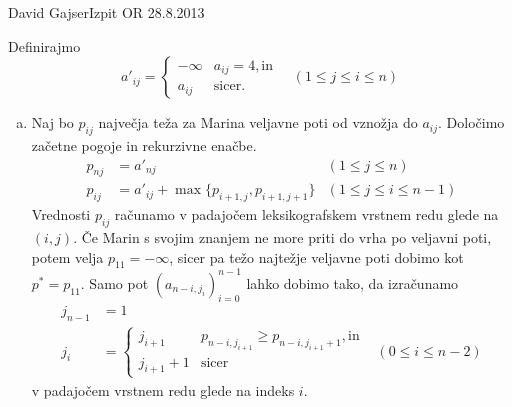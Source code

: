 \begin{naloga}{David Gajser}{Izpit OR 28.8.2013}
\begin{odgovor}
Definirajmo
$$
a'_{ij} = \begin{cases}
-\infty & a_{ij} = 4, \text{in} \\
a_{ij} & \text{sicer} .
\end{cases} \quad (1 \le j \le i \le n)
$$
\begin{enumerate}[(a)]
\item Naj bo $p_{ij}$ največja teža za Marina veljavne poti
od vznožja do $a_{ij}$.
Določimo začetne pogoje in rekurzivne enačbe.
\begin{align*}
p_{nj} &= a'_{nj} & (1 \le j \le n) \\
p_{ij} &= a'_{ij} + \max\{p_{i+1,j}, p_{i+1,j+1}\} & (1 \le j \le i \le n-1)
\end{align*}
Vrednosti $p_{ij}$ računamo
v padajočem leksikografskem vrstnem redu glede na $(i, j)$.
Če Marin s svojim znanjem ne more priti do vrha po veljavni poti,
potem velja $p_{11} = -\infty$,
sicer pa težo najtežje veljavne poti dobimo kot $p^* = p_{11}$.
Samo pot $(a_{n-i, j_i})_{i=0}^{n-1}$ lahko dobimo tako,
da izračunamo
\begin{align*}
j_{n-1} &= 1 \\
j_i &= \begin{cases}
j_{i+1} & p_{n-i,j_{i+1}} \ge p_{n-i,j_{i+1}+1}, \text{in} \\
j_{i+1} + 1 & \text{sicer}
\end{cases}
& (0 \le i \le n-2)
\end{align*}
v padajočem vrstnem redu glede na indeks $i$.


\end{enumerate}
\end{odgovor}
\end{naloga}
